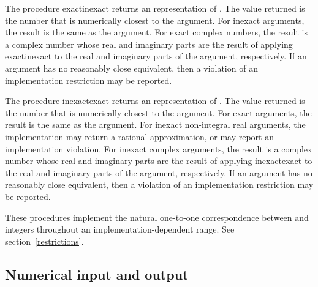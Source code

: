 \begin{entry}{%
}

The procedure {\cf exact\coerce{}inexact} returns an  representation of .
The value returned is the
 number that is numerically closest to the argument.  
For inexact arguments, the result is the same as the argument. For exact
complex numbers, the result is a complex number whose real and imaginary
parts are the result of applying {\cf exact\coerce{}inexact} to the real
and imaginary parts of the argument, respectively.
If an  argument has no reasonably close  equivalent,
then a violation of an implementation restriction may be reported.

The procedure {\cf inexact\coerce{}exact} returns an  representation of
.  The value returned is the  number that is numerically
closest to the argument.
For exact arguments, the result is the same as the argument. For inexact
non-integral real arguments, the implementation may return a rational
approximation, or may report an implementation violation. For inexact
complex arguments, the result is a complex number whose real and
imaginary parts are the result of applying {\cf inexact\coerce{}exact} to the
real and imaginary parts of the argument, respectively.
If an  argument has no reasonably close  equivalent,
then a violation of an implementation restriction may be reported.


These procedures implement the natural one-to-one correspondence between
 and  integers throughout an
implementation-dependent range.  See section~\ref{restrictions}.

\end{entry}

\medskip

\subsection{Numerical input and output}

